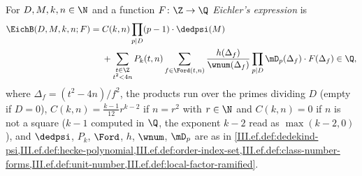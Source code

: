 For $D,M,k,n\in\N$ and a function $F\colon\Z\to\Q$ \emph{Eichler's expression} is
\[
\begin{aligned}
  \EichB(D,M,k,n;F)={}&C(k,n)\prod_{p\mid D}(p-1)\cdot\dedpsi(M)\\
  &+\sum_{\substack{t\in\Z\\ t^2<4n}}P_k(t,n)\sum_{f\in\Ford(t,n)}\frac{h(\Delta_f)}{\wnum(\Delta_f)}\prod_{p\mid D}\mD_p(\Delta_f)\cdot F(\Delta_f)\in\Q,
\end{aligned}
\]
where $\Delta_f=(t^2-4n)/f^2$, the products run over the primes dividing $D$ (empty if $D=0$), $C(k,n)=\frac{k-1}{12}r^{k-2}$ if $n=r^2$ with
$r\in\N$ and $C(k,n)=0$ if $n$ is not a square ($k-1$ computed in $\Q$, the exponent $k-2$ read as $\max(k-2,0)$), and $\dedpsi$, $P_k$, $\Ford$, $h$,
$\wnum$, $\mD_p$ are as in
\cref{III.ef.def:dedekind-psi,III.ef.def:hecke-polynomial,III.ef.def:order-index-set,III.ef.def:class-number-forms,III.ef.def:unit-number,III.ef.def:local-factor-ramified}.
